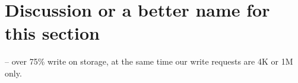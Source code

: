 \section{Discussion or a better name for this section}
\label{sec:discuss} 

-- over 75\% write on storage, at the same time our write requests are 4K or 1M only. 
